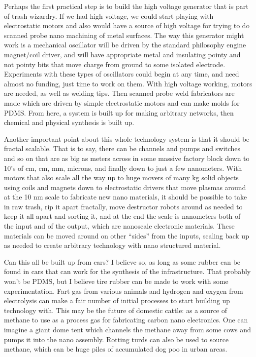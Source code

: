 Perhaps the first practical step is to build the high voltage generator
that is part of trash wizardry. If we had high voltage, we could start
playing with electrostatic motors and also would have a source of high
voltage for trying to do scanned probe nano machining of metal surfaces.
The way this generator might work is a mechanical oscillator will be
driven by the standard philosophy engine magnet/coil driver, and will
have appropriate metal and insulating pointy and not pointy bits that
move charge from ground to some isolated electrode. Experiments with
these types of oscillators could begin at any time, and need almost no
funding, just time to work on them. With high voltage working, motors
are needed, as well as welding tips. Then scanned probe weld fabricators
are made which are driven by simple electrostatic motors and can make
molds for PDMS. From here, a system is built up for making arbitrary
networks, then chemical and physical synthesis is built up.

Another important point about this whole technology system is that it
should be fractal scalable. That is to say, there can be channels and
pumps and switches and so on that are as big as meters across in some
massive factory block down to 10's of cm, cm, mm, microns, and finally
down to just a few nanometers. With motors that also scale all the way
up to huge movers of many kg solid objects using coils and magnets down
to electrostatic drivers that move plasmas around at the 10 nm scale to
fabricate new nano materials, it should be possible to take in raw
trash, rip it apart fractally, move destructor robots around as needed
to keep it all apart and sorting it, and at the end the scale is
nanometers both of the input and of the output, which are nanoscale
electronic materials. These materials can be moved around on other
``sides'' from the inputs, scaling back up as needed to create arbitrary
technology with nano structured material.

Can this all be built up from cars? I believe so, as long as some rubber
can be found in cars that can work for the synthesis of the
infrastructure. That probably won't be PDMS, but I believe tire rubber
can be made to work with some experimentation. Fart gas from various
animals and hydrogen and oxygen from electrolysis can make a fair number
of initial processes to start building up technology with. This may be
the future of domestic cattle: as a source of methane to use as a
process gas for fabricating carbon nano electronics. One can imagine a
giant dome tent which channels the methane away from some cows and pumps
it into the nano assembly. Rotting turds can also be used to source
methane, which can be huge piles of accumulated dog poo in urban areas.

